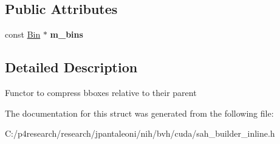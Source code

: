 \subsection*{\-Public \-Attributes}
\begin{DoxyCompactItemize}
\item 
\hypertarget{structnih_1_1cuda_1_1sah_1_1_bbox__compressor_a78323594f0e153df8c53da4238da5b03}{
const \hyperlink{structnih_1_1cuda_1_1sah_1_1_bin}{\-Bin} $\ast$ {\bfseries m\-\_\-bins}}
\label{structnih_1_1cuda_1_1sah_1_1_bbox__compressor_a78323594f0e153df8c53da4238da5b03}

\end{DoxyCompactItemize}


\subsection{\-Detailed \-Description}
\-Functor to compress bboxes relative to their parent 

\-The documentation for this struct was generated from the following file\-:\begin{DoxyCompactItemize}
\item 
\-C\-:/p4research/research/jpantaleoni/nih/bvh/cuda/sah\-\_\-builder\-\_\-inline.\-h\end{DoxyCompactItemize}
